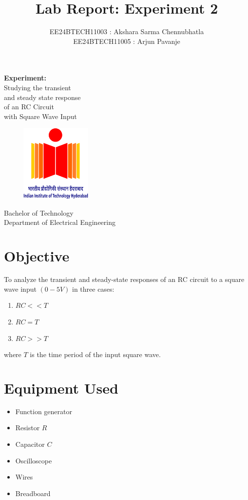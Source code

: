 \documentclass[a4paper,12pt]{article}
\title{\textbf{Lab Report: Experiment 2}}
\author{EE24BTECH11003 : Akshara Sarma Chennubhatla\\EE24BTECH11005 : Arjun Pavanje}
\begin{document}
\maketitle
\begin{center}
	\textbf{Experiment:}\\Studying the transient\\and steady state response\\of an RC Circuit\\with Square Wave Input
\end{center}
\vspace{30pt}
\begin{figure}[h!]
	\centering
	\includegraphics[width = 100pt]{.logo/logo.png}\\
\end{figure}
\begin{center}
	Bachelor of Technology\\
	\vspace{10pt}
	Department of Electrical Engineering\\
\end{center}
\newpage
\section*{Objective}

To analyze the transient and steady-state responses of an RC circuit to a square wave input $(0-5V)$ in three cases: \newline
\begin{enumerate}
	\item $RC << T$\\
	\item $RC = T$\\
	\item $RC >> T$
\end{enumerate}
where $T$ is the time period of the input square wave.


\section*{Equipment Used}
\begin{itemize}
	\item Function generator
	\item Resistor \(R\)
	\item Capacitor \(C\)
	\item Oscilloscope
	\item Wires
	\item Breadboard
\end{itemize}
\end{document}

